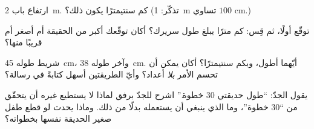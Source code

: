 \begin{exercise}[$\star$]\label{exo:g2:measuring-length:7}
ارتفاع باب \qty{2}{m}. كم سنتيمترًا يكون ذلك؟ (تذكّر:
\qty{1}{m} تساوي $100$ \unit{cm}.)
\end{exercise}

\begin{exercise}[$\star$]\label{exo:g2:measuring-length:8}
توقّع أولًا، ثم قِس: كم مترًا يبلغ طول سريرك؟ أكان توقّعك أكبر
من الحقيقة أم أصغر أم قريبًا منها؟
\end{exercise}

\begin{exercise}[$\star\star$]\label{exo:g2:measuring-length:9}
شريط طوله \qty{45}{cm}، وآخر طوله \qty{38}{cm}. أيّهما أطول، وبكم
سنتيمترًا؟ أكان يمكن أن تحسم الأمر \emph{بلا} أعداد؟ وأيّ الطريقتين
أسهل كتابةً في رسالة؟
\end{exercise}

\begin{exercise}[$\star\star$]\label{exo:g2:measuring-length:10}
يقول الجدّ: ``طول حديقتي $30$ خطوة.'' اشرح للجدّ برفق لماذا لا
يستطيع غيره أن يتحقّق من ``$30$ خطوة''، وما الذي ينبغي أن يستعمله
بدلًا من ذلك. وماذا يحدث لو قطع طفل صغير الحديقة نفسها بخطواته؟
\end{exercise}
